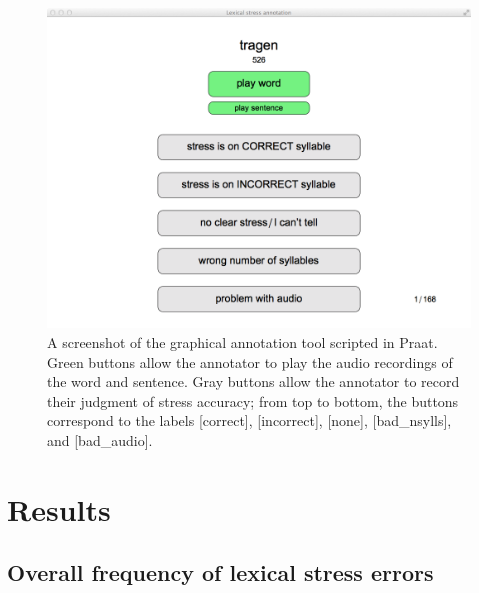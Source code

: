 		\begin{figure}[bht]
			\centering
			\includegraphics[width=\textwidth]{../img/screenshots/AnnotationTool}
			\caption[A screenshot of the graphical annotation tool scripted in Praat.]{A screenshot of the graphical annotation tool scripted in Praat. Green buttons allow the annotator to play the audio recordings of the word and sentence. Gray buttons allow the annotator to record their judgment of stress accuracy; from top to bottom, the buttons correspond to the labels [correct], [incorrect], [none], [bad\_nsylls], and [bad\_audio].}
			\label{fig:annotationtool}
		\end{figure}
	
	\section{Results}
	\label{sec:lexstress:results}	
	
	
	
		\subsection{Overall frequency of lexical stress errors}
		\label{sec:results:overall}
		
		
